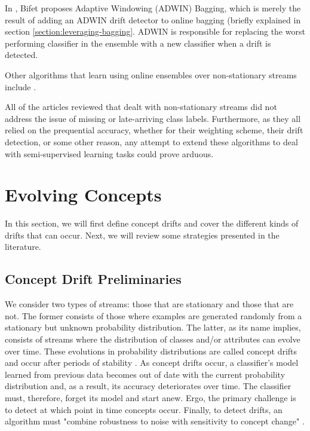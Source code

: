 In \cite{bifet2009new}, Bifet proposes Adaptive Windowing (ADWIN) Bagging, which is merely the result of adding an ADWIN drift detector to online bagging (briefly explained in section \ref{section:leveraging-bagging}. ADWIN is responsible for replacing the worst performing classifier in the ensemble with a new classifier when a drift is detected.

Other algorithms that learn using online ensembles over non-stationary streams include \cite{BRZEZINSKI201450, Kolter:2005:UAE:1102351.1102408, Kolter20072755, kuncheva2004classifier, minku2012ddd, stanley2003learning, yoshida2011adaptive}.

All of the articles reviewed that dealt with non-stationary streams did not address the issue of missing or late-arriving class labels. Furthermore, as they all relied on the prequential accuracy, whether for their weighting scheme, their drift detection, or some other reason, any attempt to extend these algorithms to deal with semi-supervised learning tasks could prove arduous.

\section{Evolving Concepts\label{section:concept_drift}}
In this section, we will first define concept drifts and cover the different kinds of drifts that can occur. Next, we will review some strategies presented in the literature.

\subsection{Concept Drift Preliminaries}

We consider two types of streams: those that are stationary and those that are not. The former consists of those where examples are generated randomly from a stationary but unknown probability distribution. The latter, as its name implies, consists of streams where the distribution of classes and/or attributes can evolve over time. These evolutions in probability distributions are called concept drifts and occur after periods of stability \cite{gama2010knowledge, KRAWCZYK2017132}. As concept drifts occur, a classifier's model learned from previous data becomes out of date with the current probability distribution and, as a result, its accuracy deteriorates over time. The classifier must, therefore, forget its model and start anew.
Ergo, the primary challenge is to detect at which point in time concepts occur. Finally, to detect drifts, an algorithm must "combine robustness to noise with sensitivity to concept change" \cite{gama2010knowledge}.

